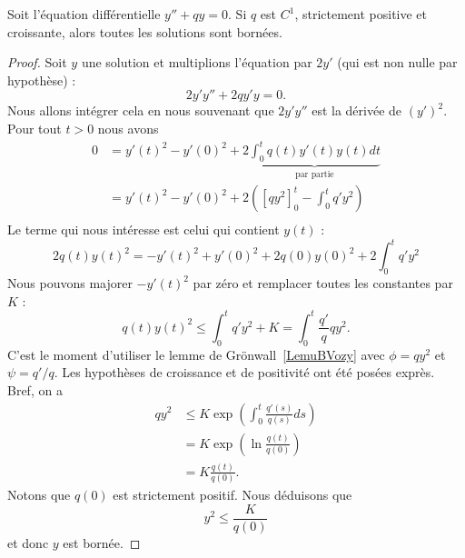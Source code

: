 \begin{proposition} \label{PropMYskGa}
    Soit l'équation différentielle \( y''+qy=0\). Si \( q\) est \( C^1\), strictement positive et croissante, alors toutes les solutions sont bornées.
\end{proposition}

\begin{proof}
    Soit \( y\) une solution et multiplions l'équation par \( 2y'\) (qui est non nulle par hypothèse) :
    \begin{equation}
        2y'y''+2qy'y=0.
    \end{equation}
    Nous allons intégrer cela en nous souvenant que \( 2y'y''\) est la dérivée de \( (y')^2\). Pour tout \( t>0\) nous avons
    \begin{subequations}
        \begin{align}
            0&=y'(t)^2-y'(0)^2+2\underbrace{\int_0^tq(t)y'(t)y(t)dt}_{\text{par partie}}\\
            &=y'(t)^2-y'(0)^2+2\left( [qy^2]_0^t-\int_0^tq'y^2 \right)\\
        \end{align}
    \end{subequations}
    Le terme qui nous intéresse est celui qui contient \( y(t)\) :
    \begin{equation}
        2q(t)y(t)^2=-y'(t)^2+y'(0)^2+2q(0)y(0)^2+2\int_0^t q'y^2
    \end{equation}
    Nous pouvons majorer \( -y'(t)^2\) par zéro et remplacer toutes les constantes par \( K\) :
    \begin{equation}
        q(t)y(t)^2\leq\int_0^tq'y^2+K=\int_0^t\frac{ q' }{ q }qy^2.
    \end{equation}
    C'est le moment d'utiliser le lemme de Grönwall~\ref{LemuBVozy} avec \( \phi=qy^2\) et \( \psi=q'/q\). Les hypothèses de croissance et de positivité ont été posées exprès. Bref, on a
    \begin{subequations}
        \begin{align}
            qy^2&\leq K\exp\left( \int_0^t\frac{ q'(s) }{ q(s) }ds \right)\\
            &=K\exp\left( \ln\frac{ q(t) }{ q(0) } \right)\\
            &=K\frac{ q(t) }{ q(0) }.
        \end{align}
    \end{subequations}
    Notons que \( q(0)\) est strictement positif. Nous déduisons que
    \begin{equation}
        y^2\leq \frac{ K }{ q(0) }
    \end{equation}
    et donc \( y\) est bornée.
\end{proof}

